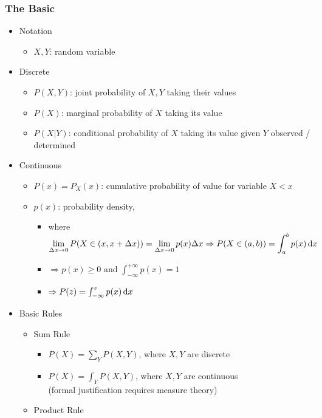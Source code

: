 \subsubsection{The Basic}
\begin{itemize}
\item Notation
	\begin{itemize}
	\item $X,Y$: random variable
	\end{itemize}
\item Discrete 
	\begin{itemize}
	\item $P(X,Y)$: joint probability of $X,Y$ taking their values
	\item $P(X)$: marginal probability of $X$ taking its value
	\item $P(X|Y)$: conditional probability of $X$ taking its value given $Y$ observed / determined
	\end{itemize}
\item Continuous
	\begin{itemize}
	\item $P(x) = P_X(x)$: cumulative probability of value for variable $X < x$
	\item $p(x)$: probability density,
		\begin{itemize}
		\item where $\displaystyle \lim_{\Delta x \rightarrow 0} P(X\in(x,x+\Delta x)) = \lim_{\Delta x \rightarrow 0}p(x)\Delta x \Rightarrow \displaystyle P(X\in(a,b))=\int_a^b p(x)\mathop{}\!\mathrm{d} x$
		\item $\displaystyle \Rightarrow p(x )\ge 0 \text{ and } \int^{+\infty}_{-\infty} p(x) = 1$
		\item $\Rightarrow P(z) = \int_{-\infty}^z p(x)\mathop{}\!\mathrm{d} x$
		\end{itemize}
	\end{itemize}
\item Basic Rules
	\begin{itemize}
	\item Sum Rule
		\begin{itemize}
		\item $\displaystyle P(X) = \sum_Y P(X,Y)$, where $X,Y$ are discrete
		\item $\displaystyle P(X) = \int_Y P(X,Y)$, where $X,Y$ are continuous \\
		(formal justification requires measure theory)
		\end{itemize}
	\item Product Rule
		\begin{itemize}

\end{itemize}
\end{itemize}
\end{itemize}
